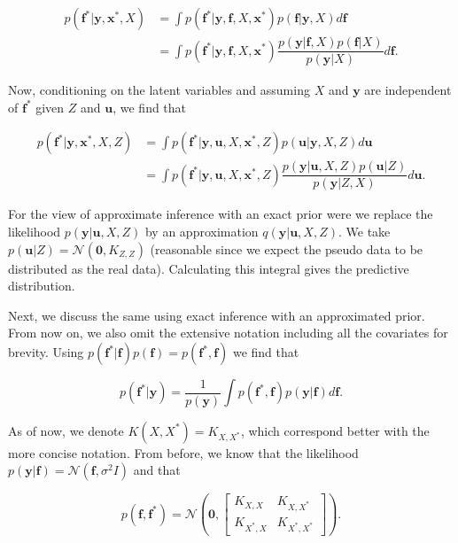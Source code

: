 \documentclass[12pt,a4paper,oneside]{book}
\begin{document}
\begin{align}\label{integraal}
p(\bm{f}^{\ast}|\bm{y}, \bm{x}^{\ast}, X) &= \int p(\bm{f}^{\ast} | \bm{y}, \bm{f},X, \bm{x}^{\ast}) p(\bm{f} | \bm{y}, X)d\bm{f} \\
 &= \int p(\bm{f}^{\ast} | \bm{y}, \bm{f}, X, \bm{x}^{\ast}) \dfrac{p(\bm{y} |  \bm{f}, X) p(\bm{f}| X )}{ p(\bm{y}| X)} d\bm{f}.
\end{align}


Now, conditioning on the latent variables and assuming $X$ and $\bm{y}$ are independent of $\bm{f}^{\ast}$ given $Z$ and $\bm{u}$, we find that

\begin{align}\label{approximate_llh}
p(\bm{f}^{\ast}|\bm{y}, \bm{x}^{\ast}, X, Z) &= \int p(\bm{f}^{\ast} | \bm{y}, \bm{u},X, \bm{x}^{\ast},Z) p(\bm{u} | \bm{y}, X,Z)d\bm{u} \\
 &= \int p(\bm{f}^{\ast} | \bm{y}, \bm{u},X,\bm{x}^{\ast}, Z) \dfrac{p(\bm{y} | \bm{u}, X,Z) p(\bm{u}| Z )}{ p(\bm{y}| Z,X )} d\bm{u}.
\end{align}

For the view of approximate inference with an exact prior were we replace the likelihood $p(\bm{y} | \bm{u}, X,Z)$ by an approximation  $q(\bm{y} | \bm{u}, X,Z)$. We take $p(\bm{u}|Z) = \mathcal{N}(\bm{0},K_{Z,Z})$ (reasonable since we expect the pseudo data to be distributed as the real data). Calculating this integral gives the predictive distribution. 

Next, we discuss the same using exact inference with an approximated prior. From now on, we also omit the extensive notation including all the covariates for brevity. Using $p(\bm{f}^{\ast} | \bm{f}) p(\bm{f})  = p(\bm{f}^{\ast} , \bm{f})$ we find that 

\begin{equation}
p(\bm{f}^{\ast}|\bm{y})=  \dfrac{1}{ p(\bm{y})}\int  p(\bm{f}^{\ast} , \bm{f}) p(\bm{y} | \bm{f})  d\bm{f}.
\end{equation}
 
As of now, we denote $K(X,X^{\ast}) = K_{X,X^{\ast}}$, which correspond better with the more concise notation. From before, we know that the likelihood $p(\bm{y}|\bm{f}) =  \mathcal{N} (\bm{f}, \sigma^2 I)$ and that 

\begin{equation}
p(\bm{f},\bm{f}^{\ast}) = 
\mathcal{N} \left( \bm{0}, 
\begin{bmatrix}
    K_{X,X} & K_{X,X^{\ast}}\\
    K_{X^{\ast},X}  & K_{X^{\ast},X^{\ast}}
\end{bmatrix} 
\right).
\end{equation}
\end{document}
